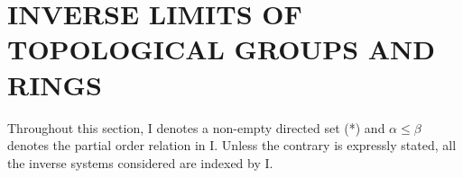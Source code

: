 \section{INVERSE LIMITS OF TOPOLOGICAL GROUPS AND RINGS}

Throughout this section, I denotes a non-empty directed set (*) and \(\alpha \leqslant \beta\) denotes the partial order relation in I. Unless the contrary is expressly stated, all the inverse systems considered are indexed by I.
\relax{}
